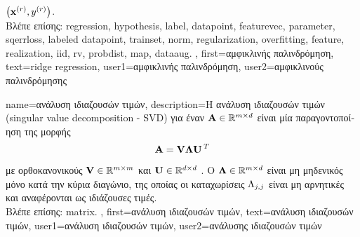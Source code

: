 {{		$\left( {\bf x}^{(r)},y^{(r)} \right)$.\\
	    	\foreignlanguage{greek}{Βλέπε επίσης:} \gls{regression}, \gls{hypothesis}, \gls{label}, \gls{datapoint}, \gls{featurevec}, \gls{parameter}, 
		\gls{sqerrloss}, \gls{labeled datapoint}, \gls{trainset}, \gls{norm}, \gls{regularization}, \gls{overfitting}, \gls{feature}, \gls{realization}, 
		\gls{iid}, \gls{rv}, \gls{probdist}, \gls{map}, \gls{dataaug}. },
	    first={\foreignlanguage{greek}{αμφικλινής παλινδρόμηση}},
	    text={ridge regression},
	    user1={\foreignlanguage{greek}{αμφικλινής παλινδρόμηση}}, %
	    user2={\foreignlanguage{greek}{αμφικλινούς παλινδρόμησης}} %
}

{name={\foreignlanguage{greek}{ανάλυση ιδιαζουσών τιμών}}, 
  	description={\foreignlanguage{greek}{Η ανάλυση ιδιαζουσών τιμών} 
		(singular value decomposition - SVD) \foreignlanguage{greek}{για έναν} 
		 ${\bf A} \in \mathbb{R}^{m \times d}$ 
		\foreignlanguage{greek}{είναι μία παραγοντοποί\-ηση της μορφής  
		$${\bf A} = \mathbf{V} {\bm \Lambda} \mathbf{U}\,^{T}$$ 
		με ορθοκανονικούς}  $\mathbf{V} \in \mathbb{R}^{m \times m}$ 
		\foreignlanguage{greek}{και} $\mathbf{U} \in \mathbb{R}^{d \times d}$ \cite{GolubVanLoanBook}. 
		\foreignlanguage{greek}{Ο}  ${\bm \Lambda} \in \mathbb{R}^{m \times d}$ 
		\foreignlanguage{greek}{είναι μη μηδενικός μόνο κατά την κύρια διαγώνιο, της οποίας οι καταχωρίσεις 
		$\Lambda_{j,j}$ είναι μη αρνητικές και αναφέρονται ως ιδιάζουσες τιμές.} \\
		\foreignlanguage{greek}{Βλέπε επίσης:} \gls{matrix}. },
	first={\foreignlanguage{greek}{ανάλυση ιδιαζουσών τιμών}},
	text={\foreignlanguage{greek}{ανάλυση ιδιαζουσών τιμών}},
	user1={\foreignlanguage{greek}{ανάλυση ιδιαζουσών τιμών}}, %
	user2={\foreignlanguage{greek}{ανάλυσης ιδιαζουσών τιμών}} %
}

